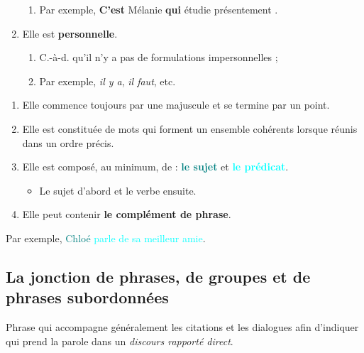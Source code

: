 \documentclass[10pt, french]{article}
\begin{document}
\begin{multicols*}{2}
\begin{definitionNOHFILLprop}
\begin{enumerate}
\begin{enumerate}
		\item	Par exemple, \og \textbf{C'est} Mélanie \textbf{qui} étudie présentement \fg{}.
		\end{enumerate}
	\item	Elle est \textbf{personnelle}.
		\begin{enumerate}
		\item	C.-à-d. qu'il n'y a pas de formulations impersonnelles ;
		\item	Par exemple, \textit{il y a}, \textit{il faut}, etc.
		\end{enumerate}
\end{enumerate}
\end{definitionNOHFILLprop}

\begin{definitionNOHFILLpropos}[Caractéristiques]
\begin{enumerate}
	\item	Elle commence toujours par une majuscule et se termine par un point.
	\item	Elle est constituée de mots qui forment un ensemble cohérents lorsque réunis dans un ordre précis.
	\item	Elle est composé, au minimum, de : \textbf{\textcolor{teal}{le sujet}} et \textbf{\textcolor{cyan}{le prédicat}}.
		\begin{itemize}
		\item	Le sujet d'abord et le verbe ensuite.
		\end{itemize}
	\item	Elle peut contenir \textbf{le complément de phrase}.
\end{enumerate}
\tcbline
Par exemple, \textcolor{teal}{Chloé} \textcolor{cyan}{parle de sa meilleur amie}.
\end{definitionNOHFILLpropos}


\columnbreak
\subsection{La jonction de phrases, de groupes et de phrases subordonnées}
\begin{definitionNOHFILL}
Phrase qui accompagne généralement les citations et les dialogues afin d'indiquer qui prend la parole dans un \textit{discours rapporté direct}.	\\


\end{definitionNOHFILL}
\end{multicols*}
\end{document}
